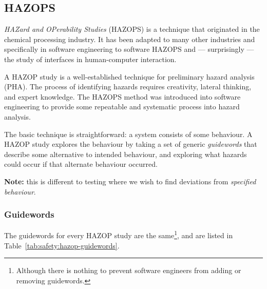   \subsection{HAZOPS}
  
\emph{HAZard and OPerability Studies} (HAZOPS) is a technique that originated in the chemical processing industry. It has been adapted to many other industries and specifically in software engineering to software HAZOPS and --- surprisingly --- the study of interfaces in human-computer interaction.

A HAZOP study is a well-established technique for preliminary hazard
  analysis (PHA). The process of identifying hazards requires creativity, lateral thinking, and expert knowledge. The HAZOPS method was introduced into software engineering to provide some repeatable and systematic process into hazard analysis.

The basic technique is straightforward: a system consists of some behaviour. A HAZOP study explores the behaviour by taking a set of generic \emph{guidewords} that describe some alternative to intended behaviour, and exploring what hazards could occur if that alternate behaviour occurred.

{\bf Note:} this is different to testing where we wish to find deviations from {\em specified behaviour}.

\subsubsection*{Guidewords}

The guidewords for every HAZOP study are the same\footnote{Although there is nothing to prevent software engineers from adding or removing guidewords.}, and are listed in Table~\ref{tab:safety:hazop-guidewords}.

